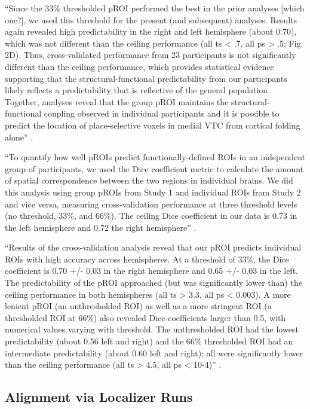 ``Since the 33\% thresholded pROI performed the best in the prior analyses
[which one?], we used this threshold for the present (and subsequent) analyses.
%
Results again revealed high predictability in the right and left hemisphere
(about 0.70), which was not different than the ceiling performance (all ts < .7,
all ps > .5; Fig. 2D).
%
Thus, cross-validated performance from 23 participants is not significantly
different than the ceiling performance, which provides statistical evidence
supporting that the structural-functional predictability from our participants
likely reflects a predictability that is reflective of the general population.
%
Together, analyses reveal that the group pROI maintains the
structural-functional coupling observed in individual participants and it is
possible to predict the location of place-selective voxels in medial VTC from
cortical folding alone'' \citep{weiner2018defining}.

``To quantify how well pROIs predict functionally-defined ROIs in an independent
group of participants, we used the Dice coefficient metric to calculate the
amount of spatial correspondence between the two regions in individual brains.
%
We did this analysis using group pROIs from Study 1 and individual ROIs from
Study 2 and vice versa, measuring cross-validation performance at three
threshold levels (no threshold, 33\%, and 66\%).
%
The ceiling Dice coefficient in our data is 0.73 in the left hemisphere
and 0.72 the right hemisphere'' \citep{weiner2018defining}.

``Results of the cross-validation analysis reveal that our pROI predicts
individual ROIs with high accuracy across hemispheres.
%
At a threshold of 33\%, the Dice coefficient is 0.70 +/- 0.03 in the right
hemisphere and 0.65 +/- 0.03 in the left.
%
The predictability of the pROI approached (but was significantly lower than) the
ceiling performance in both hemispheres (all ts > 3.3, all ps < 0.003).
%
A more lenient pROI (an unthresholded ROI) as well as a more stringent ROI (a
thresholded ROI at 66\%) also revealed Dice coefficients larger than 0.5, with
numerical values varying with threshold.
%
The unthresholded ROI had the lowest predictability (about 0.56 left and right)
and the 66\% thresholded ROI had an intermediate predictability (about 0.60 left
and right); all were significantly lower than the ceiling performance (all ts >
4.5, all ps < 10-4)'' \citep{weiner2018defining}.




\subsection{Alignment via Localizer Runs}


